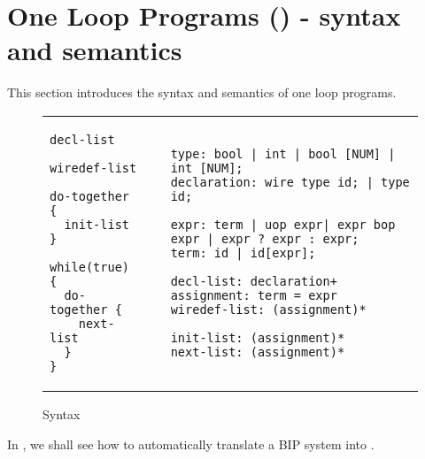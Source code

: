 \section{One Loop Programs (\caig) - syntax and semantics}
\label{sec:this}
%
%
This section introduces the syntax and semantics of one loop programs.
%




\begin{figure*}
\begin{tabular}{p{3cm}p{0.2cm}p{10cm}}
\begin{lstlisting}
decl-list

wiredef-list

do-together {
  init-list 
}

while(true) {
  do-together {
    next-list
  } 
}
\end{lstlisting}
&
&
\begin{lstlisting}
type: bool | int | bool [NUM] | int [NUM]; 
declaration: wire type id; | type id;

expr: term | uop expr| expr bop expr | expr ? expr : expr;
term: id | id[expr]; 

decl-list: declaration+
assignment: term = expr
wiredef-list: (assignment)*

init-list: (assignment)* 
next-list: (assignment)* 
\end{lstlisting}
\end{tabular}
\vspace{-2em}
\caption{\caig Syntax}
\label{fig:gr}
\end{figure*}
%

%
In , we shall see how to automatically translate a BIP system into \caig.
